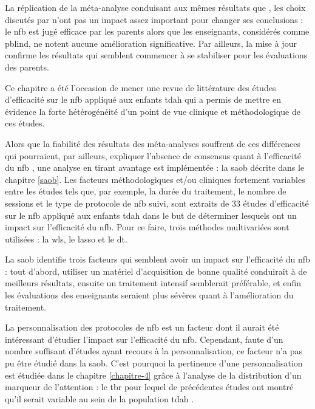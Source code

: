La réplication de la méta-analyse conduisant aux mêmes résultats que \citet{Cortese2016}, les choix discutés par \citet{Micoulaud2016} n'ont pas un impact assez
important pour changer ses conclusions : le \gls{nfb} est jugé efficace par les parents alors que les enseignants, considérés comme \gls{pblind}, ne notent aucune
amélioration significative. Par ailleurs, la mise à jour confirme les résultats qui semblent commencer à se stabiliser pour les évaluations des parents.

Ce chapitre a été l'occasion de mener une revue de littérature des études d'efficacité sur le \gls{nfb} appliqué aux enfants \gls{tdah} 
qui a permis de mettre en évidence la forte hétérogénéité d'un point de vue clinique et méthodologique de ces études. 

Alors que la fiabilité des résultats des méta-analyses souffrent de ces différences qui pourraient, par ailleurs, expliquer l'absence de consensus quant 
à l'efficacité du \gls{nfb} \citep{Alkoby2017}, une analyse en tirant avantage est implémentée : la \gls{saob} décrite dans le chapitre \ref{saob}. 
Les facteurs méthodologiques et/ou cliniques fortement variables entre les études tels que, par exemple, la durée du traitement, le nombre de sessions et le type 
de protocole de \gls{nfb} suivi, sont extraits de 33 études d'efficacité sur le \gls{nfb} appliqué aux enfants \gls{tdah} dans le but de déterminer lesquels 
ont un impact sur l'efficacité du \gls{nfb}. Pour ce faire, trois méthodes multivariées sont utilisées : la \gls{wls}, le \gls{lasso} et le \gls{dt}. 

La \gls{saob} identifie trois facteurs qui semblent avoir un impact sur l'efficacité du \gls{nfb} : tout d'abord, utiliser un matériel d'acquisition de bonne 
qualité conduirait à de meilleurs résultats, ensuite un traitement intensif semblerait préférable, et enfin les évaluations des enseignants seraient plus
sévères quant à l'amélioration du traitement. 

La personnalisation des protocoles de \gls{nfb} est un facteur dont il aurait été intéressant d'étudier l'impact sur l'efficacité du \gls{nfb}.  
Cependant, faute d'un nombre suffisant d'études ayant recours à la personnalisation, ce facteur n'a pas pu être étudié dans la \gls{saob}. C'est pourquoi
la pertinence d'une personnalisation est étudiée dans le chapitre \ref{chapitre-4} grâce à l'analyse de la distribution d'un marqueur de l'attention : le \gls{tbr} pour
lequel de précédentes études ont montré qu'il serait variable au sein de la population \gls{tdah} \citep{Zhang2017, Arns2013, Clarke2001}.

